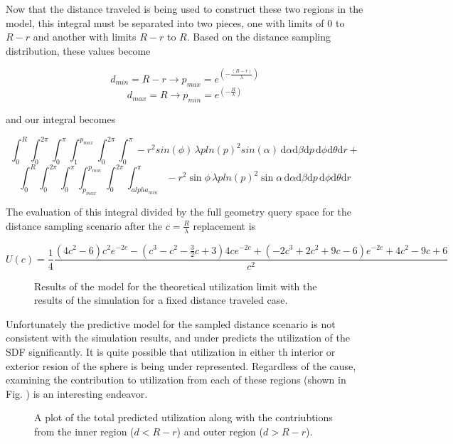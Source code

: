 Now that the distance traveled is being used to construct these two regions in
the model, this integral must be separated into two pieces, one with limits of $0$
to $R-r$ and another with limits $R-r$ to $R$. Based on the distance sampling
distribution, these values become

$$ d_{min} = R-r \rightarrow p_{max} = e^{(-\frac{(R-r)}{\lambda})} $$
$$ d_{max} = R   \rightarrow p_{min} = e^{(-\frac{R}{\lambda})} $$

and our integral becomes

$$ \int_{0}^{R}\int_{0}^{2\pi}\int_{0}^{\pi}\int_{1}^{p_{max}}\int_{0}^{2\pi}\int_{0}^{\pi}
-r^2sin(\phi) \, \lambda p ln(p)^2 sin(\alpha) \, \mathrm{d}\alpha \mathrm{d}\beta \mathrm{d}p \, \mathrm{d}\phi
\mathrm{d}\theta \mathrm{d}r + $$
$$ \int_{0}^{R}\int_{0}^{2\pi}\int_{0}^{\pi}\int_{p_{max}}^{p_{min}}\int_{0}^{2\pi}\int_{alpha_{min}}^{\pi}
-r^2\sin{\phi} \, \lambda p ln(p)^2 \sin{\alpha} \, \mathrm{d}\alpha \mathrm{d}\beta \mathrm{d}p \, \mathrm{d}\phi
\mathrm{d}\theta \mathrm{d}r $$

The evaluation of this integral divided by the full geometry query space for the
distance sampling scenario after the $c=\frac{R}{\lambda}$ replacement is

$$U(c) = \frac{1}{4}\frac{(4 c^2-6) c^2e^{-2c} - (c^3-c^2-\frac{3}{2}
c+3)4ce^{-2c}+(-2 c^3+2c^2+9c-6) e^{-2c}+4c^2-9 c+6}{c^2}$$

\begin{figure}[ht] \label{fig:sdf_sampled_dist}
\centering
{\textwidth}
\caption{Results of the model for the theoretical utilization limit with the
results of the simulation for a fixed distance traveled case.}
\end{figure}

Unfortunately the predictive model for the sampled distance scenario is not
consistent with the simulation results, and under predicts the utilization of
the SDF significantly. It is quite possible that utilization in either th interior or exterior
resion of the sphere is being under represented. Regardless of the cause, examining the contribution to
utilization from each of these regions (shown in
Fig. \label{fig:util_region_contributions}) is an interesting endeavor.


\begin{figure}[ht] \label{fig:util_region_contributions}
\centering
{\textwidth}
\caption{A plot of the total predicted utilization along with the contriubtions
from the inner region ($d < R-r$) and outer region ($d > R-r$).}
\end{figure}

